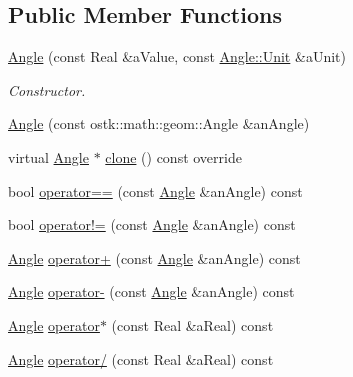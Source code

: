 \subsection*{Public Member Functions}
\begin{DoxyCompactItemize}
\item 
\hyperlink{classostk_1_1physics_1_1units_1_1_angle_a4892c7a7ed48adabf5c942dbda7ad848}{Angle} (const Real \&a\+Value, const \hyperlink{classostk_1_1physics_1_1units_1_1_angle_aea1f8018b1d378b9dee56959d8eb9def}{Angle\+::\+Unit} \&a\+Unit)
\begin{DoxyCompactList}\small\item\em Constructor. \end{DoxyCompactList}\item 
\hyperlink{classostk_1_1physics_1_1units_1_1_angle_a77a11a481467020f3bf965473dc37878}{Angle} (const ostk\+::math\+::geom\+::\+Angle \&an\+Angle)
\item 
virtual \hyperlink{classostk_1_1physics_1_1units_1_1_angle}{Angle} $\ast$ \hyperlink{classostk_1_1physics_1_1units_1_1_angle_af0d5d649b2a1310e6337663f7b9283bf}{clone} () const override
\item 
bool \hyperlink{classostk_1_1physics_1_1units_1_1_angle_a1199d17a4ea17dc976879f309a5e919f}{operator==} (const \hyperlink{classostk_1_1physics_1_1units_1_1_angle}{Angle} \&an\+Angle) const
\item 
bool \hyperlink{classostk_1_1physics_1_1units_1_1_angle_a7b920b7abe8e0fcc95a7a633f6240108}{operator!=} (const \hyperlink{classostk_1_1physics_1_1units_1_1_angle}{Angle} \&an\+Angle) const
\item 
\hyperlink{classostk_1_1physics_1_1units_1_1_angle}{Angle} \hyperlink{classostk_1_1physics_1_1units_1_1_angle_acbc8a13c8f84ed77a741538aa1d8ce91}{operator+} (const \hyperlink{classostk_1_1physics_1_1units_1_1_angle}{Angle} \&an\+Angle) const
\item 
\hyperlink{classostk_1_1physics_1_1units_1_1_angle}{Angle} \hyperlink{classostk_1_1physics_1_1units_1_1_angle_adc4e27520c40a157d3cf868b1df07c1c}{operator-\/} (const \hyperlink{classostk_1_1physics_1_1units_1_1_angle}{Angle} \&an\+Angle) const
\item 
\hyperlink{classostk_1_1physics_1_1units_1_1_angle}{Angle} \hyperlink{classostk_1_1physics_1_1units_1_1_angle_abd90998581807fadf43720f558061115}{operator$\ast$} (const Real \&a\+Real) const
\item 
\hyperlink{classostk_1_1physics_1_1units_1_1_angle}{Angle} \hyperlink{classostk_1_1physics_1_1units_1_1_angle_a5507ed91abc944fd4cc91f5488276e95}{operator/} (const Real \&a\+Real) const

\end{DoxyCompactItemize}
